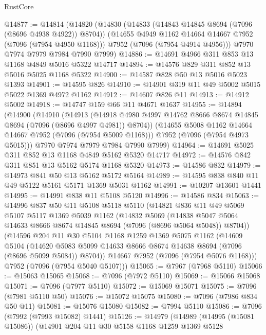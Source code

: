 \begin{lexlean}{RustCore}
\begin{coremodule}
@14877 := @14814
    (@14820
      (@14830
        (@14833 (@14843 @14845 @8694 (@7096 (@8696 @4938 @4922)) @8704))
        (@14655 @4949 @1162 @14664 @14667 @7952 (@7096 (@7954 @4950 @1168)))
        @7952
        (@7096 (@7954 @4914 @4956)))
      @7970
      @7974
      @7979
      @7984
      @7990
      @7999)
@14886 := @14691 @4966 @311 @853 @13 @1168 @4849 @5016 @5322 @14717
@14894 := @14576 @829 @311 @852 @13 @5016 @5025 @1168 @5322
@14900 := @14587 @828 @50 @13 @5016 @5023 @1393
@14901 := @14595 @826
@14910 := @14901 @319 @11 @49 @5002 @5015 @5022 @1369 @4972 @1162
@14912 := @14607 @826 @11
@14913 := @14912 @5002
@14918 := @14747 @159 @66 @11 @4671 @1637
@14955 := @14894
    (@14900
      (@14910
        (@14913
          (@14918 @4980 @4997 @14762 @8666 @8674 @14845 @8694 (@7096 (@8696 @4997 @4981)) @8704))
        (@14655 @5008 @1162 @14664 @14667 @7952 (@7096 (@7954 @5009 @1168)))
        @7952
        (@7096 (@7954 @4973 @5015)))
      @7970
      @7974
      @7979
      @7984
      @7990
      @7999)
@14964 := @14691 @5025 @311 @852 @13 @1168 @4849 @5162 @5320 @14717
@14972 := @14576 @842 @311 @851 @13 @5162 @5174 @1168 @5320
@14973 := @14586 @832
@14979 := @14973 @841 @50 @13 @5162 @5172 @5164
@14989 := @14595 @838 @840 @11 @49 @5122 @5161 @5171 @1369 @5031 @1162
@14991 := @10207 @13601 @1441
@14995 := @14991 @838 @11 @5108 @5120
@14996 := @14586 @834
@15063 := @14996
    @837
    @50
    @11
    @5108
    @5118
    @5110
    (@14821
      @836
      @11
      @49
      @5069
      @5107
      @5117
      @1369
      @5039
      @1162
      (@14832
        @5069
        (@14838 @5047 @5064 @14633 @8666 @8674 @14845 @8694 (@7096 (@8696 @5064 @5048)) @8704))
      (@14596
        @204
        @11
        @30
        @5104
        @1168
        @1259
        @1369
        @5075
        @1162
        (@14609
          @5104
          (@14620 @5083 @5099 @14633 @8666 @8674 @14638 @8694 (@7096 (@8696 @5099 @5084)) @8704))
        @14667
        @7952
        (@7096 (@7954 @5076 @1168)))
      @7952
      (@7096 (@7954 @5040 @5107)))
@15065 := @7967 (@7968 @5110)
@15066 := @15063 @15065
@15068 := @7096 (@7972 @5110)
@15069 := @15066 @15068
@15071 := @7096 (@7977 @5110)
@15072 := @15069 @15071
@15075 := @7096 (@7981 @5110 @50)
@15076 := @15072 @15075
@15080 := @7096 (@7986 @834 @50 @11)
@15081 := @15076 @15080
@15082 := @7994 @5110
@15086 := @7096 (@7992 (@7993 @15082) @1441)
@15126 := @14979
    (@14989
      (@14995 (@15081 @15086))
      (@14901
        @204
        @11
        @30
        @5158
        @1168
        @1259
        @1369
        @5128

\end{coremodule}
\end{lexlean}
